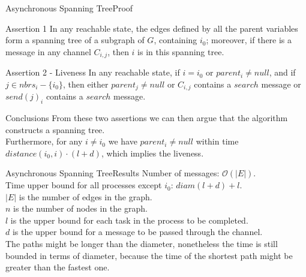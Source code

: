 \documentclass[pdf]{beamer}
\begin{document}
\begin{frame}[plain]{Asynchronous Spanning Tree}{Proof}
    \begin{block}{Assertion 1}
    In any reachable state, the edges defined by all the parent variables form a spanning tree
    of a subgraph of $G$, containing $i_0$; moreover, if there is a message in any channel $C_{i,j}$,
    then $i$ is in this spanning tree.
    \end{block}	
    \begin{block}{Assertion 2 - Liveness}
        In any reachable state, if $i=i_0$ or $parent_i \neq null$, and if $j \in nbrs_i - \{i_0\}$,
        then either $parent_j \neq null$ or $C_{i,j}$ contains a $search$ message or $send(j)_i$ contains a $search$ message.
    \end{block}	
    \begin{block}{Conclusions}
        From these two assertions we can then argue that the algorithm constructs a spanning tree.\\
        Furthermore, for any $i \neq i_0$ we have $parent_i \neq null$ within time $distance(i_0,i)\cdot(l+d)$, which implies the liveness.
    \end{block}
\end{frame}
\begin{frame}{Asynchronous Spanning Tree}{Results}
    Number of messages: $\mathcal{O}(|E|)$.\\
    Time upper bound for all processes except $i_0$: $diam(l+d)+l$.\\
    \vspace{6pt}
    $|E|$ is the number of edges in the graph.\\
    $n$ is the number of nodes in the graph.\\
    $l$ is the upper bound for each task in the process to be completed.\\
    $d$ is the upper bound for a message to be passed through the channel.\\
    \pause
    \vspace{6pt}
    The paths might be longer than the diameter, nonetheless the time is still bounded in 
    terms of diameter, because the time of the shortest path might be greater than the 
    fastest one.
\end{frame}
\end{document}
